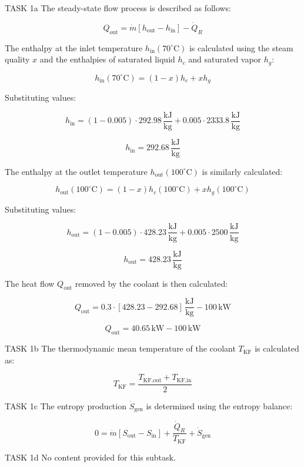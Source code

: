 TASK 1a  
The steady-state flow process is described as follows:  

\[
Q_{\text{out}} = \dot{m} \left[ h_{\text{out}} - h_{\text{in}} \right] - \dot{Q}_R
\]

The enthalpy at the inlet temperature \( h_{\text{in}}(70^\circ\text{C}) \) is calculated using the steam quality \( x \) and the enthalpies of saturated liquid \( h_c \) and saturated vapor \( h_g \):  

\[
h_{\text{in}}(70^\circ\text{C}) = (1-x) h_c + x h_g
\]

Substituting values:  

\[
h_{\text{in}} = (1-0.005) \cdot 292.98 \, \frac{\text{kJ}}{\text{kg}} + 0.005 \cdot 2333.8 \, \frac{\text{kJ}}{\text{kg}}
\]

\[
h_{\text{in}} = 292.68 \, \frac{\text{kJ}}{\text{kg}}
\]

The enthalpy at the outlet temperature \( h_{\text{out}}(100^\circ\text{C}) \) is similarly calculated:  

\[
h_{\text{out}}(100^\circ\text{C}) = (1-x) h_c(100^\circ\text{C}) + x h_g(100^\circ\text{C})
\]

Substituting values:  

\[
h_{\text{out}} = (1-0.005) \cdot 428.23 \, \frac{\text{kJ}}{\text{kg}} + 0.005 \cdot 2500 \, \frac{\text{kJ}}{\text{kg}}
\]

\[
h_{\text{out}} = 428.23 \, \frac{\text{kJ}}{\text{kg}}
\]

The heat flow \( Q_{\text{out}} \) removed by the coolant is then calculated:  

\[
Q_{\text{out}} = 0.3 \cdot \left[ 428.23 - 292.68 \right] \, \frac{\text{kJ}}{\text{kg}} - 100 \, \text{kW}
\]

\[
Q_{\text{out}} = 40.65 \, \text{kW} - 100 \, \text{kW}
\]

TASK 1b  
The thermodynamic mean temperature of the coolant \( T_{\text{KF}} \) is calculated as:  

\[
T_{\text{KF}} = \frac{T_{\text{KF,out}} + T_{\text{KF,in}}}{2}
\]

TASK 1c  
The entropy production \( \dot{S}_{\text{gen}} \) is determined using the entropy balance:  

\[
0 = \dot{m} \left[ S_{\text{out}} - S_{\text{in}} \right] + \frac{\dot{Q}_R}{T_{\text{KF}}} + \dot{S}_{\text{gen}}
\]

TASK 1d  
No content provided for this subtask.  

